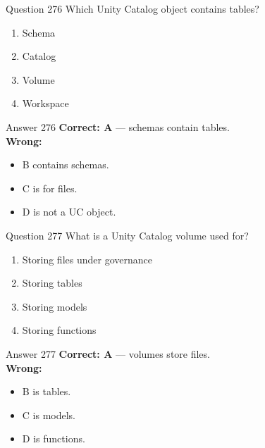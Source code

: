 \documentclass[aspectratio=169,11pt]{beamer}
\begin{document}
	\begin{frame}{Question 276}
		Which Unity Catalog object contains tables?
		\begin{enumerate}[label=\Alph*.]
			\item Schema
			\item Catalog
			\item Volume
			\item Workspace
		\end{enumerate}
	\end{frame}
	\begin{frame}{Answer 276}
		\textbf{Correct: A} --- schemas contain tables.\\
		\vspace{0.5em}
		\textbf{Wrong:}
		\begin{itemize}
			\item B contains schemas.
			\item C is for files.
			\item D is not a UC object.
		\end{itemize}
	\end{frame}
	
	\begin{frame}{Question 277}
		What is a Unity Catalog volume used for?
		\begin{enumerate}[label=\Alph*.]
			\item Storing files under governance
			\item Storing tables
			\item Storing models
			\item Storing functions
		\end{enumerate}
	\end{frame}
	\begin{frame}{Answer 277}
		\textbf{Correct: A} --- volumes store files.\\
		\vspace{0.5em}
		\textbf{Wrong:}
		\begin{itemize}
			\item B is tables.
			\item C is models.
			\item D is functions.
		\end{itemize}
	\end{frame}
	
\end{document}
